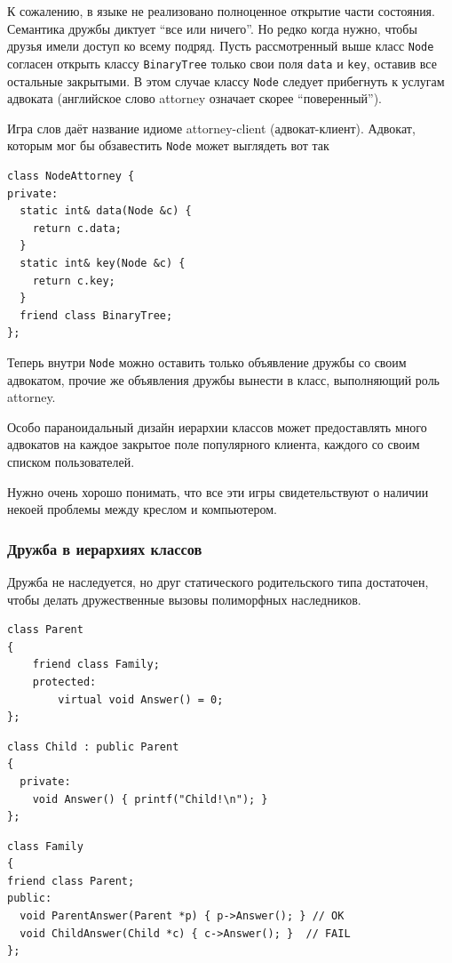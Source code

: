 \documentclass[a4paper,12pt,oneside]{article}
\begin{document}
К сожалению, в языке не реализовано полноценное открытие части состояния. Семантика дружбы диктует ``все или ничего''. Но редко когда нужно, чтобы друзья имели доступ ко всему подряд. Пусть рассмотренный выше класс \lstinline!Node! согласен открыть классу \lstinline!BinaryTree! только свои поля \lstinline!data! и \lstinline!key!, оставив все остальные закрытыми. В этом случае классу \lstinline!Node! следует прибегнуть к услугам адвоката (английское слово attorney означает скорее ``поверенный'').

Игра слов даёт название идиоме attorney-client (адвокат-клиент). Адвокат, которым мог бы обзавестить \lstinline!Node! может выглядеть вот так

\begin{lstlisting}
class NodeAttorney {
private:
  static int& data(Node &c) {
    return c.data;
  } 
  static int& key(Node &c) {
    return c.key;
  } 
  friend class BinaryTree;
};
\end{lstlisting}

Теперь внутри \lstinline!Node! можно оставить только объявление дружбы со своим адвокатом, прочие же объявления дружбы вынести в класс, выполняющий роль attorney.

Особо параноидальный дизайн иерархии классов может предоставлять много адвокатов на каждое закрытое поле популярного клиента, каждого со своим списком пользователей.

Нужно очень хорошо понимать, что все эти игры свидетельствуют о наличии некоей проблемы между креслом и компьютером.

\subsubsection{Дружба в иерархиях классов}

Дружба не наследуется, но друг статического родительского типа достаточен, чтобы делать дружественные вызовы полиморфных наследников.

\begin{lstlisting}
class Parent
{
    friend class Family;
    protected:
        virtual void Answer() = 0;
};
\end{lstlisting}

\begin{lstlisting}
class Child : public Parent
{
  private:
    void Answer() { printf("Child!\n"); }
};
\end{lstlisting}

\begin{lstlisting}
class Family
{
friend class Parent;
public:
  void ParentAnswer(Parent *p) { p->Answer(); } // OK
  void ChildAnswer(Child *c) { c->Answer(); }  // FAIL
};
\end{lstlisting}
\end{document}
